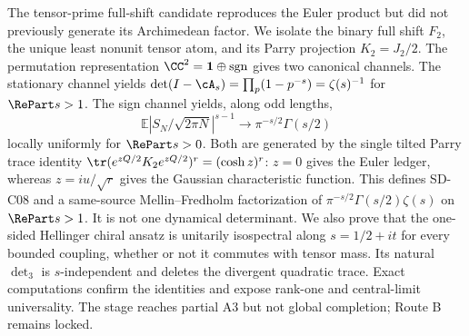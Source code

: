 The tensor-prime full-shift candidate reproduces the Euler product but did
not previously generate its Archimedean factor. We isolate the binary full
shift $F_2$, the unique least nonunit tensor atom, and its Parry projection
$K_2=J_2/2$. The permutation representation
$\CC^2=\mathbf1\oplus\mathrm{sgn}$ gives two canonical channels. The
stationary channel yields
$\det(I-\cA_s)=\prod_p(1-p^{-s})=\zeta(s)^{-1}$ for $\RePart s>1$.
The sign channel yields, along odd lengths,
\[
 \mathbb E\left|S_N/\sqrt{2\pi N}\right|^{s-1}
 \longrightarrow \pi^{-s/2}\Gamma(s/2)
\]
locally uniformly for $\RePart s>0$. Both are generated by the single tilted
Parry trace identity
$\tr(e^{zQ/2}K_2e^{zQ/2})^r=(\cosh z)^r$: $z=0$ gives the Euler ledger,
whereas $z=iu/\sqrt r$ gives the Gaussian characteristic function. This
defines SD-C08 and a same-source Mellin--Fredholm factorization of
$\pi^{-s/2}\Gamma(s/2)\zeta(s)$ on $\RePart s>1$. It is not one dynamical
determinant. We also prove that the one-sided Hellinger chiral ansatz is
unitarily isospectral along $s=1/2+it$ for every bounded coupling, whether or
not it commutes with tensor mass. Its natural $\det_3$ is $s$-independent and deletes the divergent
quadratic trace. Exact computations confirm the identities and expose
rank-one and central-limit universality. The stage reaches partial A3 but not
global completion; Route B remains locked.
